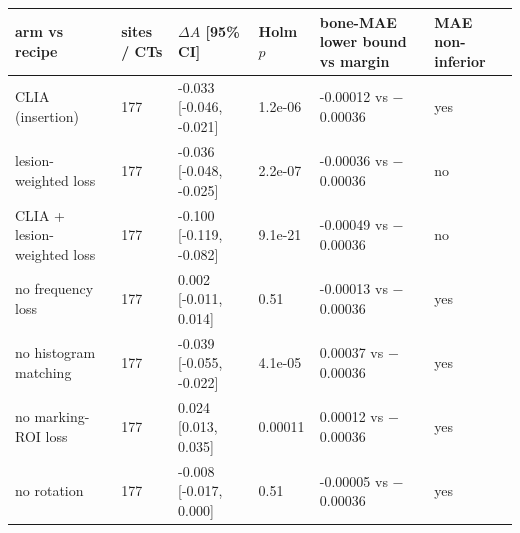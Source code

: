 \begin{tabular}{llllll}
\toprule
arm vs recipe & sites / CTs & $\Delta A$ [95\% CI] & Holm $p$ & bone-MAE lower bound vs margin & MAE non-inferior \\
\midrule
CLIA (insertion) & 177 & -0.033 [-0.046, -0.021] & 1.2e-06 & -0.00012 vs $-$0.00036 & yes \\
lesion-weighted loss & 177 & -0.036 [-0.048, -0.025] & 2.2e-07 & -0.00036 vs $-$0.00036 & no \\
CLIA + lesion-weighted loss & 177 & -0.100 [-0.119, -0.082] & 9.1e-21 & -0.00049 vs $-$0.00036 & no \\
no frequency loss & 177 & 0.002 [-0.011, 0.014] & 0.51 & -0.00013 vs $-$0.00036 & yes \\
no histogram matching & 177 & -0.039 [-0.055, -0.022] & 4.1e-05 & 0.00037 vs $-$0.00036 & yes \\
no marking-ROI loss & 177 & 0.024 [0.013, 0.035] & 0.00011 & 0.00012 vs $-$0.00036 & yes \\
no rotation & 177 & -0.008 [-0.017, 0.000] & 0.51 & -0.00005 vs $-$0.00036 & yes \\
\bottomrule
\end{tabular}
